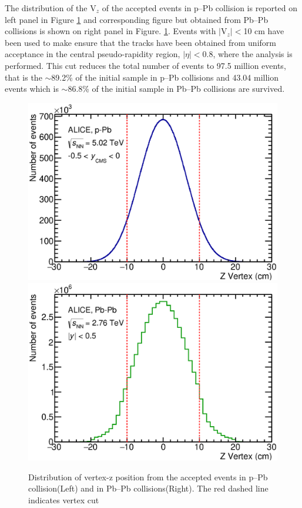 The distribution of the V$_{z}$ of the accepted events in p--Pb collision is reported on left panel in Figure \ref{fig:VzDistribution} and corresponding figure but obtained from Pb--Pb collisions is shown on right panel in Figure. \ref{fig:VzDistribution}. Events with $|$V$_{z}|<$10 cm have been used to make ensure that the tracks have been obtained from uniform acceptance in the central pseudo-rapidity region, $|\eta|<$0.8, where the analysis is performed. This cut reduces the total number of events to 97.5 million events, that is the $\sim$89.2\% of the initial sample in p--Pb collisions and 43.04 million events which is $\sim$86.8\% of the initial sample in Pb--Pb collisions are survived.


\begin{figure}[htbp]
\begin{center}
\includegraphics[width=7.cm]{./Version1/FigChapter5/Selection/pPbVertexZ.eps}
\hspace{0.5cm}
\includegraphics[width=7.cm]{./Version1/FigChapter5/Selection/PbPbVertexZ.eps}
\caption{Distribution of vertex-z position from the accepted events in p--Pb collision(Left) and in Pb--Pb collisions(Right). The red dashed line indicates vertex cut }
\label{fig:VzDistribution}
\end{center}
\end{figure}

